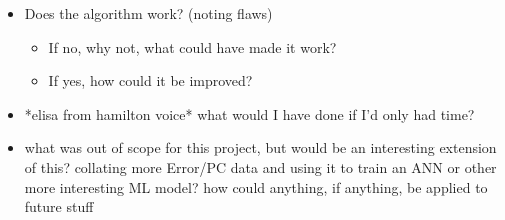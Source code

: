 \begin{itemize}

\item Does the algorithm work? (noting flaws)
\begin{itemize}
\item If no, why not, what could have made it work? 
\item If yes, how could it be improved? 
\end{itemize}

\item *elisa from hamilton voice* what would I have done if I'd only had time?
\item what was out of scope for this project, but would be an interesting extension of this? collating more Error/PC data and using it to train an ANN or other more interesting ML model? how could anything, if anything, be applied to future stuff
\end{itemize}